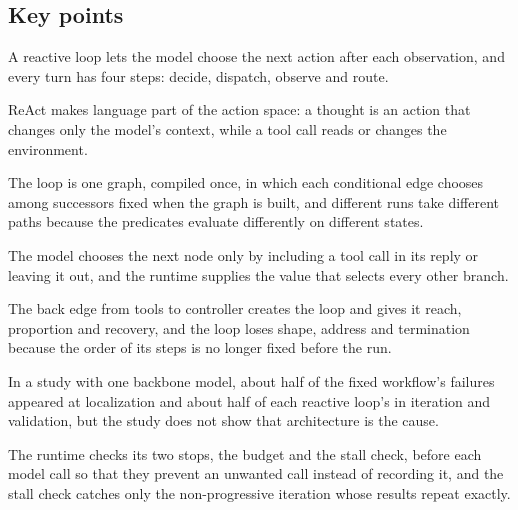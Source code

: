\subsection*{Key points}
\bi
\item A reactive loop lets the model choose the next action after each observation, and every turn
has four steps: decide, dispatch, observe and route.
\item ReAct makes language part of the action space: a thought is an action that changes only the
model's context, while a tool call reads or changes the environment.
\item The loop is one graph, compiled once, in which each conditional edge chooses among successors
fixed when the graph is built, and different runs take different paths because the predicates
evaluate differently on different states.
\item The model chooses the next node only by including a tool call in its reply or leaving it out,
and the runtime supplies the value that selects every other branch.
\item The back edge from tools to controller creates the loop and gives it reach, proportion and
recovery, and the loop loses shape, address and termination because the order of its steps is no
longer fixed before the run.
\item In a study with one backbone model, about half of the fixed workflow's failures appeared at
localization and about half of each reactive loop's in iteration and validation, but the study does
not show that architecture is the cause.
\item The runtime checks its two stops, the budget and the stall check, before each model call so
that they prevent an unwanted call instead of recording it, and the stall check catches only the
non-progressive iteration whose results repeat exactly.
\ei
